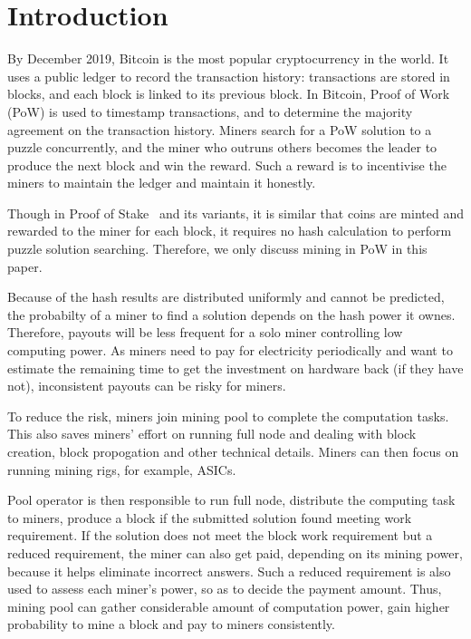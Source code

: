\section{Introduction}
\label{sec:intro}

By December 2019, Bitcoin is the most popular cryptocurrency in the world.
It uses a public ledger to record the transaction history: transactions are stored in blocks, and each block is linked to its previous block.
In Bitcoin, Proof of Work (PoW) is used to timestamp transactions, and to determine the majority agreement on the transaction history.
Miners search for a PoW solution to a puzzle concurrently, and the miner who outruns others becomes the leader to produce the next block and win the reward.
Such a reward is to incentivise the miners to maintain the ledger and maintain it honestly.


Though in Proof of Stake~\cite{} and its variants, it is similar that coins are minted and rewarded to the miner for each block, it requires no hash calculation to perform puzzle solution searching.
Therefore, we only discuss mining in PoW in this paper.


Because of the hash results are distributed uniformly and cannot be predicted, the probabilty of a miner to find a solution depends on the hash power it ownes.
Therefore, payouts will be less frequent for a solo miner controlling low computing power.
As miners need to pay for electricity periodically and want to estimate the remaining time to get the investment on hardware back (if they have not), inconsistent payouts can be risky for miners.

To reduce the risk, miners join mining pool to complete the computation tasks.
This also saves miners' effort on running full node and dealing with block creation, block propogation and other technical details.
Miners can then focus on running mining rigs, for example, ASICs.

Pool operator is then responsible to run full node, distribute the computing task to miners, 
produce a block if the submitted solution found meeting work requirement.
If the solution does not meet the block work requirement but a reduced requirement, the miner can also get paid, depending on its mining power, because it helps eliminate incorrect answers.
Such a reduced requirement is also used to assess each miner's power, so as to decide the payment amount.
Thus, mining pool can gather considerable amount of computation power, gain higher probability to mine a block and pay to miners consistently.

